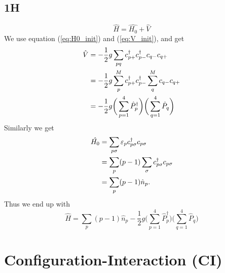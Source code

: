 \documentclass[norsk,a4paper,12pt]{article}
\begin{document}
\subsection*{1H}
\begin{equation}
\hat{H}=\hat{H_0}+\hat{V}
\end{equation}
We use equation (\ref{eq:H0_init}) and (\ref{eq:V_init}), and get
\begin{align}
\hat{V}&=-\frac{1}{2}g\sum_{pq}c_{p+}^{\dagger}c_{p-}^{\dagger}c_{q-}c_{q+}\notag\\
&=-\frac{1}{2}g\sum_{p}^Mc_{p+}^{\dagger}c_{p-}^{\dagger}\sum_q^Mc_{q-}c_{q+}\notag\\
&=-\frac{1}{2}g\bigg(\sum_{p=1}^4\hat{P}_p^{\dagger}\bigg)\bigg(\sum_{q=1}^4\hat{P}_q\bigg)
\end{align}
Similarly we get
\begin{align}
\hat{H_0}&=\sum_{p\sigma}\varepsilon_pc_{p\sigma}^{\dagger}c_{p\sigma}\notag\\
&=\sum_p(p-1)\sum_{\sigma}c_{p\sigma}^{\dagger}c_{p\sigma}\notag\\
&=\sum_p(p-1)\hat{n}_p.
\end{align}
Thus we end up with
\begin{equation}
\hat{H}=\sum_p(p-1)\hat{n}_p-\frac{1}{2}g\bigg(\sum_{p=1}^4\hat{P}_p^{\dagger}\bigg)\bigg(\sum_{q=1}^4\hat{P}_q\bigg)
\end{equation}

\section{Configuration-Interaction (CI)}
\end{document}
